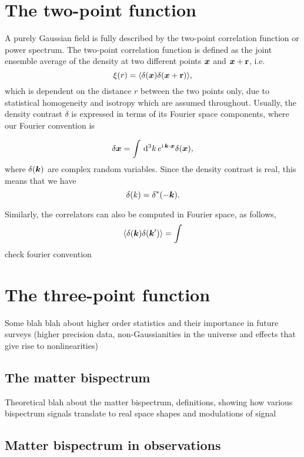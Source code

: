 \section{The two-point function}

A purely Gaussian field is fully described by the two-point correlation function or power spectrum. The two-point correlation function is defined as the joint ensemble average of the density at two different points $\bm {x}$ and $\bm {x} + \textbf{r}$, i.e. 
\begin{equation}
	\xi(r) = \langle \delta(\bm {x}) \delta(\bm {x} + \textbf{r}) \rangle,
\end{equation}
which is dependent on the distance $r$ between the two points only, due to statistical homogeneity and isotropy which are assumed throughout. Usually, the density contrast $\delta$ is expressed in terms of its Fourier space components, where our Fourier convention is 

\begin{equation}
	\delta{\bm {x}} = \int \,\mathrm{d}^3k \, e^{\mathrm{i\,} \bm {k} \cdot \bm {x} } \delta(\bm {x}),
\end{equation}
where $\delta(\bm {k})$ are complex random variables. Since the density contrast is real, this means that we have
\begin{equation}
	\delta(k) = \delta^*(-\bm {k}).
\end{equation}

Similarly, the correlators can also be computed in Fourier space, as follows, 
\begin{equation}
	\langle \delta(\bm {k}) \delta(\bm {k}') \rangle = \int 
\end{equation}
check fourier convention 
\section{The three-point function}

Some blah blah about higher order statistics and their importance in future surveys (higher precision data, non-Gaussianities in the universe and effects that give rise to nonlinearities)

\subsection{The matter bispectrum}

Theoretical blah about the matter bispectrum, definitions, showing how various bispectrum signals translate to real space shapes and modulations of signal

\subsection{Matter bispectrum in observations}

